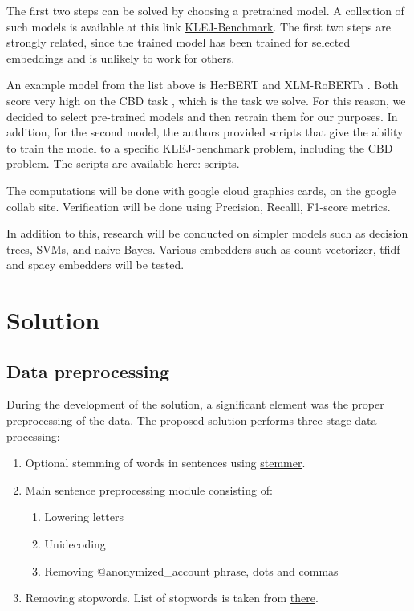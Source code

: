 \documentclass[a4paper]{article}
\begin{document}
The first two steps can be solved by choosing a pretrained model. A collection of such models is available at this link \href{https://klejbenchmark.com/leaderboard/}{KLEJ-Benchmark}.
The first two steps are strongly related, since the trained model has been trained for selected embeddings and is unlikely to work for others.

An example model from the list above is HerBERT \cite{mroczkowski-etal-2021-herbert} and XLM-RoBERTa \cite{dadas2020pretraining}. Both score very high on the CBD task \cite{ptaszynski2019results}, which is the task we solve. For this reason, we decided to select pre-trained models and then retrain them for our purposes.
In addition, for the second model, the authors provided scripts that give the ability to train the model to a specific KLEJ-benchmark problem, including the CBD problem. The scripts are available here: \href{https://github.com/sdadas/polish-roberta}{scripts}.

The computations will be done with google cloud graphics cards, on the google collab site. Verification will be done using Precision, Recalll, F1-score metrics.

In addition to this, research will be conducted on simpler models such as decision trees, SVMs, and naive Bayes. Various embedders such as count vectorizer, tfidf and spacy embedders will be tested. 

\newpage
\section{Solution}

\subsection{Data preprocessing}

During the development of the solution, a significant element was the proper preprocessing of the data. The proposed solution performs three-stage data processing:

\begin{enumerate}
    \item Optional stemming of words in sentences using \href{https://github.com/Tutanchamon/pl_stemmer/blob/master/pl_stemmer.py}{stemmer}.
    \item Main sentence preprocessing module consisting of:
    \begin{enumerate}
        \item Lowering letters
        \item Unidecoding
        \item Removing @anonymized\_account phrase, dots and commas
    \end{enumerate}
    \item Removing stopwords. List of stopwords is taken from \href{https://github.com/bieli/stopwords/blob/master/polish.stopwords.txt}{there}.
\end{enumerate}
\end{document}

